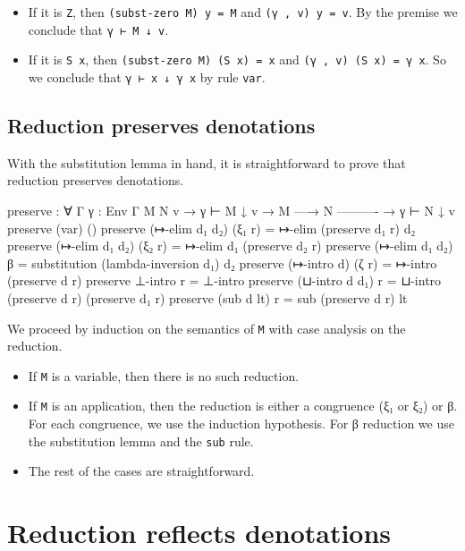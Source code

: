 \begin{itemize}
\item
  If it is \texttt{Z}, then \texttt{(subst-zero\ M)\ y\ =\ M} and
  \texttt{(γ\ ,\ v)\ y\ =\ v}. By the premise we conclude that
  \texttt{γ\ ⊢\ M\ ↓\ v}.
\item
  If it is \texttt{S\ x}, then \texttt{(subst-zero\ M)\ (S\ x)\ =\ x}
  and \texttt{(γ\ ,\ v)\ (S\ x)\ =\ γ\ x}. So we conclude that
  \texttt{γ\ ⊢\ x\ ↓\ γ\ x} by rule \texttt{var}.
\end{itemize}

\hypertarget{reduction-preserves-denotations}{%
\subsection{Reduction preserves
denotations}\label{reduction-preserves-denotations}}

With the substitution lemma in hand, it is straightforward to prove that
reduction preserves denotations.

\begin{fence}
\begin{code}
preserve : ∀ {Γ} {γ : Env Γ} {M N v}
  → γ ⊢ M ↓ v
  → M —→ N
    ----------
  → γ ⊢ N ↓ v
preserve (var) ()
preserve (↦-elim d₁ d₂) (ξ₁ r) = ↦-elim (preserve d₁ r) d₂
preserve (↦-elim d₁ d₂) (ξ₂ r) = ↦-elim d₁ (preserve d₂ r)
preserve (↦-elim d₁ d₂) β = substitution (lambda-inversion d₁) d₂
preserve (↦-intro d) (ζ r) = ↦-intro (preserve d r)
preserve ⊥-intro r = ⊥-intro
preserve (⊔-intro d d₁) r = ⊔-intro (preserve d r) (preserve d₁ r)
preserve (sub d lt) r = sub (preserve d r) lt
\end{code}
\end{fence}

We proceed by induction on the semantics of \texttt{M} with case
analysis on the reduction.

\begin{itemize}
\item
  If \texttt{M} is a variable, then there is no such reduction.
\item
  If \texttt{M} is an application, then the reduction is either a
  congruence (ξ₁ or ξ₂) or β. For each congruence, we use the induction
  hypothesis. For β reduction we use the substitution lemma and the
  \texttt{sub} rule.
\item
  The rest of the cases are straightforward.
\end{itemize}

\hypertarget{reduction-reflects-denotations}{%
\section{Reduction reflects
denotations}\label{reduction-reflects-denotations}}

